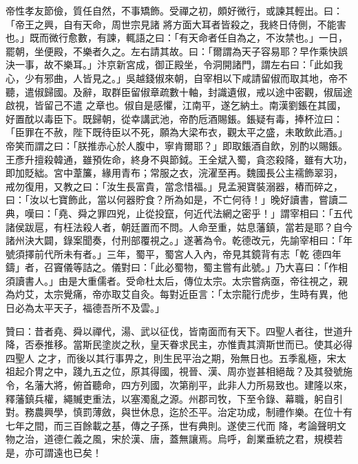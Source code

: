 \begin{pinyinscope}
 帝性孝友節儉，質任自然，不事矯飾。受禪之初，頗好微行，或諫其輕出。曰：「帝王之興，自有天命，周世宗見諸
 將方面大耳者皆殺之，我終日侍側，不能害也。」既而微行愈數，有諫，輒語之曰：「有天命者任自為之，不汝禁也。」一日，罷朝，坐便殿，不樂者久之。左右請其故。曰：「爾謂為天子容易耶？早作乘快誤決一事，故不樂耳。」汴京新宮成，御正殿坐，令洞開諸門，謂左右曰：「此如我心，少有邪曲，人皆見之。」吳越錢俶來朝，自宰相以下咸請留俶而取其地，帝不聽，遣俶歸國。及辭，取群臣留俶章疏數十軸，封識遺俶，戒以途中密觀，俶屆途啟視，皆留己不遣
 之章也。俶自是感懼，江南平，遂乞納土。南漢劉鋹在其國，好置酖以毒臣下。既歸朝，從幸講武池，帝酌卮酒賜鋹。鋹疑有毒，捧杯泣曰：「臣罪在不赦，陛下既待臣以不死，願為大梁布衣，觀太平之盛，未敢飲此酒。」帝笑而謂之曰：「朕推赤心於人腹中，寧肯爾耶？」即取鋹酒自飲，別酌以賜鋹。王彥升擅殺韓通，雖預佐命，終身不與節鉞。王全斌入蜀，貪恣殺降，雖有大功，即加貶絀。宮中葦簾，緣用青布；常服之衣，浣濯至再。魏國長公主襦飾翠羽，
 戒勿復用，又教之曰：「汝生長富貴，當念惜福。」見孟昶寶裝溺器，樁而碎之，曰：「汝以七寶飾此，當以何器貯食？所為如是，不亡何待！」晚好讀書，嘗讀二典，嘆曰：「堯、舜之罪四兇，止從投竄，何近代法網之密乎！」謂宰相曰：「五代諸侯跋扈，有枉法殺人者，朝廷置而不問。人命至重，姑息藩鎮，當若是耶？自今諸州決大闢，錄案聞奏，付刑部覆視之。」遂著為令。乾德改元，先諭宰相曰：「年號須擇前代所未有者。」三年，蜀平，蜀宮人入內，帝見其鏡背有志「乾
 德四年鑄」者，召竇儀等詰之。儀對曰：「此必蜀物，蜀主嘗有此號。」乃大喜曰：「作相須讀書人。」由是大重儒者。受命杜太后，傳位太宗。太宗嘗病亟，帝往視之，親為灼艾，太宗覺痛，帝亦取艾自灸。每對近臣言：「太宗龍行虎步，生時有異，他日必為太平天子，福德吾所不及雲。」



 贊曰：昔者堯、舜以禪代，湯、武以征伐，皆南面而有天下。四聖人者往，世道升降，否泰推移。當斯民塗炭之秋，皇天眷求民主，亦惟責其濟斯世而已。使其必得四聖人
 之才，而後以其行事畀之，則生民平治之期，殆無日也。五季亂極，宋太祖起介冑之中，踐九五之位，原其得國，視晉、漢、周亦豈甚相絕哉？及其發號施令，名藩大將，俯首聽命，四方列國，次第削平，此非人力所易致也。建隆以來，釋藩鎮兵權，繩贓吏重法，以塞濁亂之源。州郡司牧，下至令錄、幕職，躬自引對。務農興學，慎罰薄斂，與世休息，迄於丕平。治定功成，制禮作樂。在位十有七年之間，而三百餘載之基，傳之子孫，世有典則。遂使三代而
 降，考論聲明文物之治，道德仁義之風，宋於漢、唐，蓋無讓焉。烏呼，創業垂統之君，規模若是，亦可謂遠也已矣！



\end{pinyinscope}